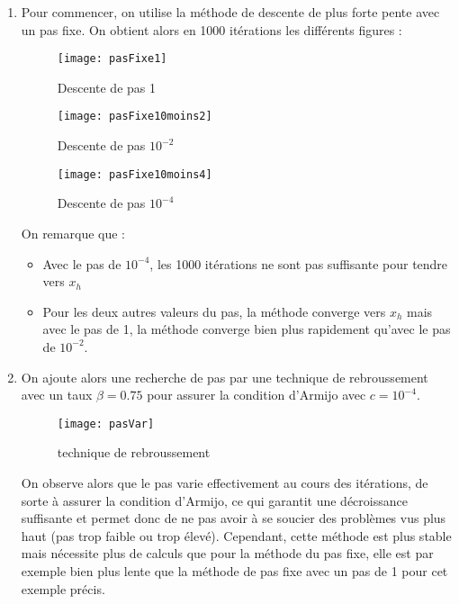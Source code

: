 \documentclass[12pt,a4paper,titlepage]{article}
\begin{document}
\begin{enumerate}
    \item{
            Pour commencer, on utilise la méthode de descente de plus forte pente avec un pas fixe.
            On obtient alors en 1000 itérations les différents figures : 
            \begin{figure}[H]
                \centering
                \texttt{[image: pasFixe1]}
                \caption{Descente de pas 1}
            \end{figure}

            \begin{figure}[H]
                \centering
                \texttt{[image: pasFixe10moins2]}
                \caption{Descente de pas $10^{-2}$}
            \end{figure}

            \begin{figure}[H]
                \centering
                \texttt{[image: pasFixe10moins4]}
                \caption{Descente de pas $10^{-4}$}
            \end{figure}

            On remarque que :
            \begin{itemize}
                \item{Avec le pas de $10^{-4}$, les 1000 itérations ne sont pas suffisante pour tendre vers $ x_h$}
                \item{Pour les deux autres valeurs du pas, la méthode converge vers $x_h$ mais avec le pas de 1, la méthode converge bien plus rapidement qu'avec le pas de $10^{-2}$.}
            \end{itemize}
        }

    \item{On ajoute alors une recherche de pas par une technique de rebroussement avec un taux $\beta = 0.75$ pour assurer la condition d'Armijo avec $c=10^{-4}$.

            \begin{figure}[H]
                \centering
                \texttt{[image: pasVar]}
                \caption{technique de rebroussement}
            \end{figure}

            On observe alors que le pas varie effectivement au cours des itérations, de sorte à assurer la
            condition d'Armijo, ce qui garantit une décroissance suffisante et permet donc de ne pas avoir à se
            soucier des problèmes vus plus haut (pas trop faible ou trop élevé). Cependant, cette méthode est
            plus stable mais nécessite plus de calculs que pour la méthode du pas fixe, elle est par exemple 
            bien plus lente que la méthode de pas fixe avec un pas de 1 pour cet exemple précis.
        }


\end{enumerate}
\end{document}

